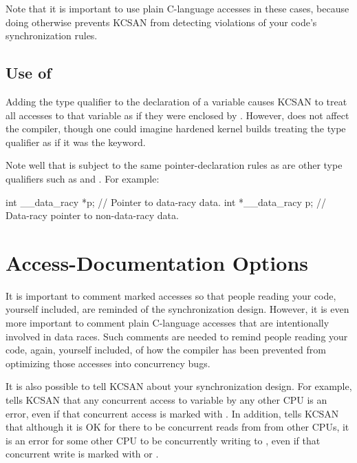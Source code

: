 Note that it is important to use plain C-language accesses in these cases,
because doing otherwise prevents KCSAN from detecting violations of your
code's synchronization rules.


\subsection{Use of }

Adding the  type qualifier to the declaration of a variable
causes KCSAN to treat all accesses to that variable as if they were
enclosed by .
However,  does not affect the compiler, though one could
imagine hardened kernel builds treating the  type qualifier
as if it was the  keyword.

Note well that  is subject to the same pointer-declaration
rules as are other type qualifiers such as  and .
For example:

\begin{VerbatimU}
	int __data_racy *p; // Pointer to data-racy data.
	int *__data_racy p; // Data-racy pointer to non-data-racy data.
\end{VerbatimU}

\section{Access-Documentation Options}

It is important to comment marked accesses so that people reading your
code, yourself included, are reminded of the synchronization design.
However, it is even more important to comment plain C-language accesses
that are intentionally involved in data races.
Such comments are needed to remind people reading your code, again,
yourself included, of how the compiler has been prevented from optimizing
those accesses into concurrency bugs.

It is also possible to tell KCSAN about your synchronization design.
For example,  tells KCSAN that any
concurrent access to variable  by any other CPU is an error, even
if that concurrent access is marked with .
In addition,  tells KCSAN that although
it is OK for there to be concurrent reads from  from other CPUs,
it is an error for some other CPU to be concurrently writing to ,
even if that concurrent write is marked with  or
.

